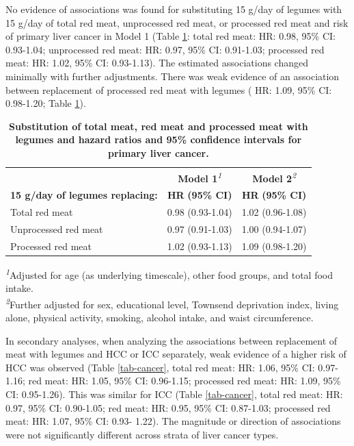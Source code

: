 \documentclass[sn-basic,Numbered,iicol,pdflatex]{sn-jnl}
\begin{document}
No evidence of associations was found for substituting 15 g/day of
legumes with 15 g/day of total red meat, unprocessed red meat, or
processed red meat and risk of primary liver cancer in Model 1 (Table
\ref{tab-main}: total red meat:
HR: 0.98, 95\% CI: 0.93-1.04;
unprocessed red meat:
HR: 0.97, 95\% CI: 0.91-1.03;
processed red meat:
HR: 1.02, 95\% CI: 0.93-1.13).
The estimated associations changed minimally with further adjustments.
There was weak evidence of an association between replacement of
processed red meat with legumes (
HR: 1.09, 95\% CI: 0.98-1.20;
Table \ref{tab-main}).

\begin{table}
\caption{{\small \textbf{Substitution of total meat, red meat and processed meat with legumes and hazard ratios and 95\% confidence intervals for primary liver cancer.}}}\label{tab-main}
\begin{tabular*}{1\linewidth}{@{\extracolsep{\fill}}lcc}
\toprule
 & {\bfseries \textbf{Model 1}}\textsuperscript{\textit{1}} & {\bfseries \textbf{Model 2}}\textsuperscript{\textit{2}} \\ 
\cmidrule(lr){2-2} \cmidrule(lr){3-3}
\textbf{15 g/day of legumes replacing:} & \textbf{HR} \textbf{(95\% CI)} & \textbf{HR} \textbf{(95\% CI)} \\ 
\midrule\addlinespace[2.5pt]
Total red meat & 0.98 (0.93-1.04) & 1.02 (0.96-1.08) \\ 
Unprocessed red meat & 0.97 (0.91-1.03) & 1.00 (0.94-1.07) \\ 
Processed red meat & 1.02 (0.93-1.13) & 1.09 (0.98-1.20) \\ 
\bottomrule
\end{tabular*}
\begin{minipage}{\linewidth}
\textsuperscript{\textit{1}}Adjusted for age (as underlying timescale), other food groups, and total food intake.\\
\textsuperscript{\textit{2}}Further adjusted for sex, educational level, Townsend deprivation index, living alone, physical activity, smoking, alcohol intake, and waist circumference.\\
\end{minipage}
\end{table}

In secondary analyses, when analyzing the associations between
replacement of meat with legumes and HCC or ICC separately, weak
evidence of a higher risk of HCC was observed (Table \ref{tab-cancer},
total red meat:
HR: 1.06, 95\% CI: 0.97-1.16;
red meat:
HR: 1.05, 95\% CI: 0.96-1.15;
processed red meat:
HR: 1.09, 95\% CI: 0.95-1.26).
This was similar for ICC (Table \ref{tab-cancer}, total red meat:
HR: 0.97, 95\% CI: 0.90-1.05;
red meat:
HR: 0.95, 95\% CI: 0.87-1.03;
processed red meat:
HR: 1.07, 95\% CI: 0.93- 1.22).
The magnitude or direction of associations were not significantly
different across strata of liver cancer types.
\end{document}
